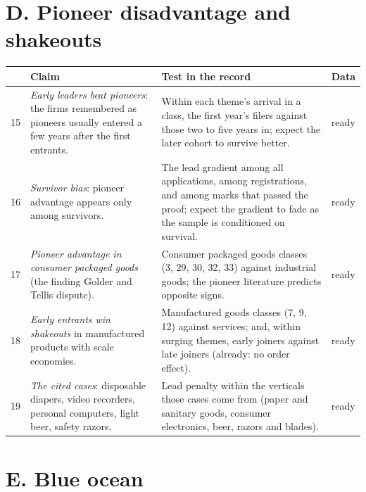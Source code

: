 \section*{D. Pioneer disadvantage \citep{GolderTellis1993} and
shakeouts \citep{KlepperMiller1995, Klepper1997}}

\begin{longtable}{p{0.4cm}p{5.3cm}p{6.2cm}p{1.5cm}}
\toprule
& Claim & Test in the record & Data \\
\midrule
\endhead
15 & \emph{Early leaders beat pioneers}: the firms remembered as
pioneers usually entered a few years after the first entrants. & Within
each theme's arrival in a class, the first year's filers against those
two to five years in; expect the later cohort to survive better. &
ready \\
16 & \emph{Survivor bias}: pioneer advantage appears only among
survivors. & The lead gradient among all applications, among
registrations, and among marks that passed the proof; expect the
gradient to fade as the sample is conditioned on survival. & ready \\
17 & \emph{Pioneer advantage in consumer packaged goods} (the finding
Golder and Tellis dispute). & Consumer packaged goods classes (3, 29,
30, 32, 33) against industrial goods; the pioneer literature predicts
opposite signs. & ready \\
18 & \emph{Early entrants win shakeouts} in manufactured products with
scale economies. & Manufactured goods classes (7, 9, 12) against
services; and, within surging themes, early joiners against late
joiners (already: no order effect). & ready \\
19 & \emph{The cited cases}: disposable diapers, video recorders,
personal computers, light beer, safety razors. & Lead penalty within
the verticals those cases come from (paper and sanitary goods, consumer
electronics, beer, razors and blades). & ready \\
\bottomrule
\end{longtable}

\section*{E. Blue ocean \citep{KimMauborgne2004}}

